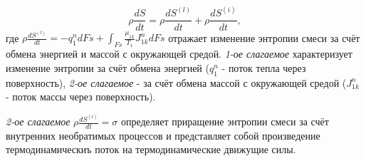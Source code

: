 \documentclass[12pt, a4paper]{report}
\begin{document}
	\begin{equation}
		\rho \frac{dS}{dt} = \rho \frac{dS^{(l)}}{dt} + \rho \frac{dS^{(i)}}{dt},
	\end{equation}
	где $\rho \frac{dS^{(l)}}{dt} = -q_{1}^{n} dFs + \int_{Fs} \frac{\mu_{1k}}{T_{1}} J_{1k}^{n} dFs$ отражает изменение энтропии смеси за счёт обмена энергией и массой с окружающей средой. \textit{1-ое слагаемое} характеризует изменение энтропии за счёт обмена энергией ($q_{1}^{n}$ - поток тепла через поверхность), \textit{2-ое слагаемое} - за счёт обмена массой с окружающей средой ($J_{1k}^{n}$ - поток массы через поверхность). \par
	\textit{2-ое слагаемое} $\rho \frac{dS^{(i)}}{dt} = \sigma$ определяет приращение энтропии смеси за счёт внутренних необратимых процессов и представляет собой произведение термодинамическиъ поток на термодинамические движущие силы. \par
\end{document}
